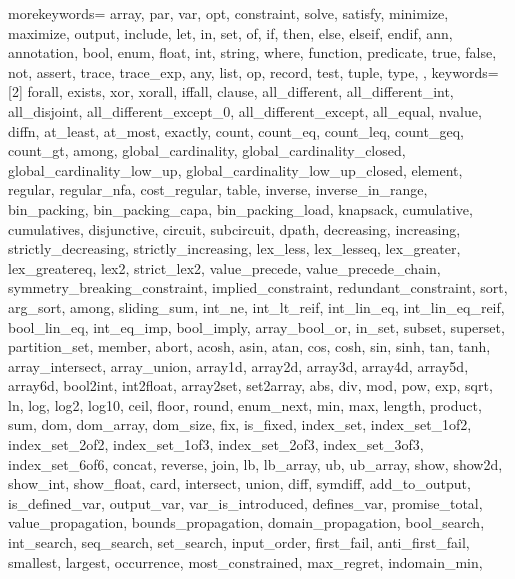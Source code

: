 \usepackage{listings}
\usepackage{courier} %

\newcommand\mznfont{\fontfamily{pcr}\selectfont}

{
  morekeywords={
  array, par, var, opt, constraint, solve, satisfy, minimize,
  maximize, output, include, let, in, set, of, if, then, else, elseif, endif,
  ann, annotation, bool, enum, float, int, string, where, function,
  predicate, true, false, not, assert, trace, trace_exp,
  any, list, op, record, test, tuple, type,
  },
  keywords=[2]{
  forall, exists, xor, xorall, iffall, clause,
  all_different, all_different_int, all_disjoint,
  all_different_except_0, all_different_except, all_equal,
  nvalue, diffn,
  at_least, at_most, exactly, %
  count, count_eq, count_leq, count_geq, count_gt, among,
  global_cardinality, global_cardinality_closed,
  global_cardinality_low_up, global_cardinality_low_up_closed,
  element, regular, regular_nfa, cost_regular, table,
  inverse, inverse_in_range,
  bin_packing, bin_packing_capa, bin_packing_load, knapsack,
  cumulative, cumulatives, disjunctive, circuit, subcircuit, dpath,
  decreasing, increasing,
  strictly_decreasing, strictly_increasing,
  lex_less, lex_lesseq, lex_greater, lex_greatereq, lex2, strict_lex2,
  value_precede, value_precede_chain,
  symmetry_breaking_constraint, implied_constraint, redundant_constraint,
  sort, arg_sort, among, sliding_sum,
  int_ne, int_lt_reif, int_lin_eq, int_lin_eq_reif, bool_lin_eq, int_eq_imp,
  bool_imply, array_bool_or,
  in_set, subset, superset, partition_set, member,
  abort,
  acosh, asin, atan, cos, cosh, sin, sinh, tan, tanh,
  array_intersect, array_union,
  array1d, array2d, array3d, array4d, array5d, array6d,
  bool2int, int2float, array2set, set2array,
  abs, div, mod, pow, exp, sqrt, ln, log, log2, log10,
  ceil, floor, round,
  enum_next,
  min, max, length, product, sum,
  dom, dom_array, dom_size, fix, is_fixed,
  index_set, index_set_1of2, index_set_2of2,
  index_set_1of3, index_set_2of3, index_set_3of3, index_set_6of6,
  concat, reverse, join,
  lb, lb_array, ub, ub_array,
  show, show2d, show_int, show_float,
  card, intersect, union, diff, symdiff,
  add_to_output,
  is_defined_var, output_var, var_is_introduced, defines_var, promise_total,
  value_propagation, bounds_propagation, domain_propagation,
  bool_search, int_search, seq_search,
  set_search, input_order, first_fail, anti_first_fail, smallest,
  largest, occurrence, most_constrained, max_regret, indomain_min,
}}
